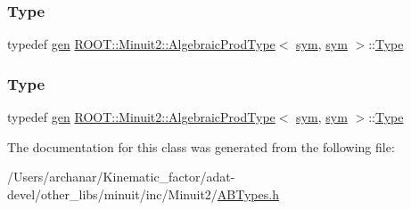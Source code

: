 \mbox{\label{classROOT_1_1Minuit2_1_1AlgebraicProdType_3_01sym_00_01sym_01_4_a0b02f8928c35c1a4580a0b80b4ed50a1}} 
\subsubsection{\texorpdfstring{Type}{Type}\hspace{0.1cm}{\footnotesize\ttfamily [2/3]}}
{\footnotesize\ttfamily typedef \mbox{\hyperlink{classROOT_1_1Minuit2_1_1gen}{gen}} \mbox{\hyperlink{classROOT_1_1Minuit2_1_1AlgebraicProdType}{R\+O\+O\+T\+::\+Minuit2\+::\+Algebraic\+Prod\+Type}}$<$ \mbox{\hyperlink{classROOT_1_1Minuit2_1_1sym}{sym}}, \mbox{\hyperlink{classROOT_1_1Minuit2_1_1sym}{sym}} $>$\+::\mbox{\hyperlink{classROOT_1_1Minuit2_1_1AlgebraicProdType_3_01sym_00_01sym_01_4_a0b02f8928c35c1a4580a0b80b4ed50a1}{Type}}}

\mbox{\label{classROOT_1_1Minuit2_1_1AlgebraicProdType_3_01sym_00_01sym_01_4_a0b02f8928c35c1a4580a0b80b4ed50a1}} 
\subsubsection{\texorpdfstring{Type}{Type}\hspace{0.1cm}{\footnotesize\ttfamily [3/3]}}
{\footnotesize\ttfamily typedef \mbox{\hyperlink{classROOT_1_1Minuit2_1_1gen}{gen}} \mbox{\hyperlink{classROOT_1_1Minuit2_1_1AlgebraicProdType}{R\+O\+O\+T\+::\+Minuit2\+::\+Algebraic\+Prod\+Type}}$<$ \mbox{\hyperlink{classROOT_1_1Minuit2_1_1sym}{sym}}, \mbox{\hyperlink{classROOT_1_1Minuit2_1_1sym}{sym}} $>$\+::\mbox{\hyperlink{classROOT_1_1Minuit2_1_1AlgebraicProdType_3_01sym_00_01sym_01_4_a0b02f8928c35c1a4580a0b80b4ed50a1}{Type}}}



The documentation for this class was generated from the following file\+:\begin{DoxyCompactItemize}
\item 
/\+Users/archanar/\+Kinematic\+\_\+factor/adat-\/devel/other\+\_\+libs/minuit/inc/\+Minuit2/\mbox{\hyperlink{adat-devel_2other__libs_2minuit_2inc_2Minuit2_2ABTypes_8h}{A\+B\+Types.\+h}}\end{DoxyCompactItemize}
